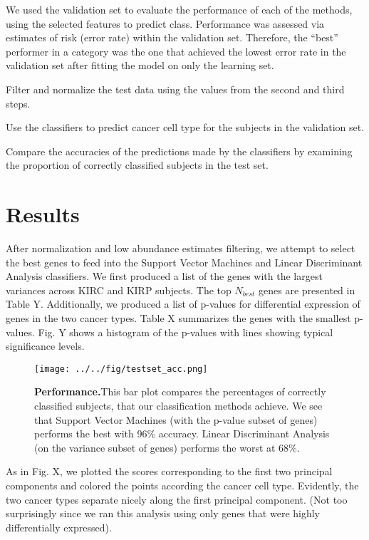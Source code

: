 We used the validation set to evaluate the performance of each of the methods,
using the selected features to predict class. Performance was assessed via
estimates of risk (error rate) within the validation set. Therefore, the
``best'' performer in a category was the one that achieved the lowest error
rate in the validation set after fitting the model on only the learning set.

Filter and normalize the test data using the values from the second and third
steps. 

Use the classifiers to predict cancer cell type for the subjects in the
validation set.

Compare the accuracies of the predictions made by the classifiers by examining
the proportion of correctly classified subjects in the test set.


\section{Results}

After normalization and low abundance estimates filtering, we attempt to select the
best genes to feed into the Support Vector Machines and Linear Discriminant
Analysis classifiers.  We first produced a list of the genes with the largest
variances across KIRC and KIRP subjects.  The top $N_{best}$ genes are
presented in Table Y. Additionally, we produced a list of p-values for
differential expression of genes in the two cancer types. Table X summarizes
the genes with the smallest p-values. Fig. Y shows a histogram of the p-values
with lines showing typical significance levels. 

\begin{figure}[H]
  \centering
    \texttt{[image: ../../fig/testset\_acc.png]}
\caption{\textbf{Performance.}This bar plot compares the percentages of correctly
  classified subjects, that our classification methods achieve. We see that
  Support Vector Machines (with the p-value subset of genes) performs the best
  with 96\% accuracy. Linear Discriminant Analysis (on the variance subset of
  genes) performs the worst at 68\%.}
   \label{fig:performance}
\end{figure}

 
As in Fig. X, we plotted the scores corresponding to the first two principal
components and colored the points according the cancer cell type. 
Evidently, the two cancer types separate nicely along the first
principal component. (Not too surprisingly since we ran this analysis using
only genes that were highly differentially expressed).  

